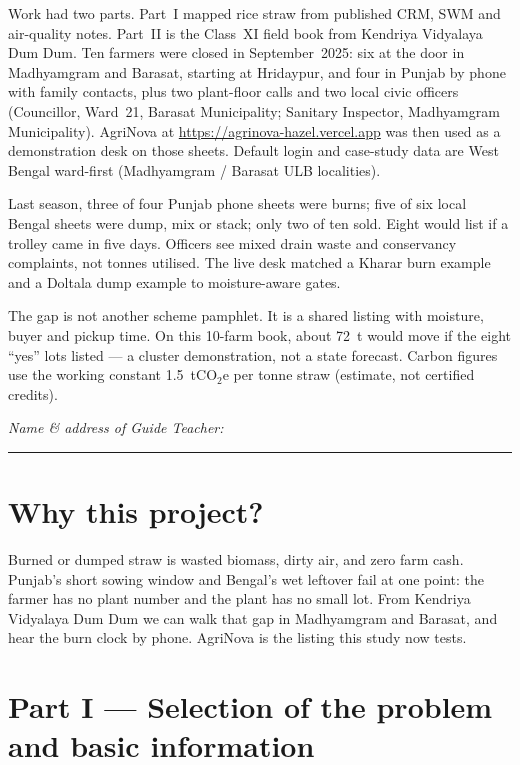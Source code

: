 \documentclass[12pt,a4paper]{article}
\begin{document}
Work had two parts. Part~I mapped rice straw from published CRM, SWM and air-quality notes. Part~II is the Class~XI field book from Kendriya Vidyalaya Dum Dum. Ten farmers were closed in September~2025: six at the door in Madhyamgram and Barasat, starting at Hridaypur, and four in Punjab by phone with family contacts, plus two plant-floor calls and two local civic officers (Councillor, Ward~21, Barasat Municipality; Sanitary Inspector, Madhyamgram Municipality). AgriNova at \url{https://agrinova-hazel.vercel.app} was then used as a demonstration desk on those sheets. Default login and case-study data are West Bengal ward-first (Madhyamgram / Barasat ULB localities).

Last season, three of four Punjab phone sheets were burns; five of six local Bengal sheets were dump, mix or stack; only two of ten sold. Eight would list if a trolley came in five days. Officers see mixed drain waste and conservancy complaints, not tonnes utilised. The live desk matched a Kharar burn example and a Doltala dump example to moisture-aware gates.

The gap is not another scheme pamphlet. It is a shared listing with moisture, buyer and pickup time. On this 10-farm book, about 72~t would move if the eight ``yes'' lots listed --- a cluster demonstration, not a state forecast. Carbon figures use the working constant 1.5~tCO$_2$e per tonne straw (estimate, not certified credits).

\vspace{0.15em}
{\footnotesize\textit{Name \& address of Guide Teacher:} \rule{9.4cm}{0.4pt}}

\section*{Why this project?}
Burned or dumped straw is wasted biomass, dirty air, and zero farm cash. Punjab's short sowing window and Bengal's wet leftover fail at one point: the farmer has no plant number and the plant has no small lot. From Kendriya Vidyalaya Dum Dum we can walk that gap in Madhyamgram and Barasat, and hear the burn clock by phone. AgriNova is the listing this study now tests.

\tableofcontents
\newpage

\section*{Part I --- Selection of the problem and basic information}
\end{document}
